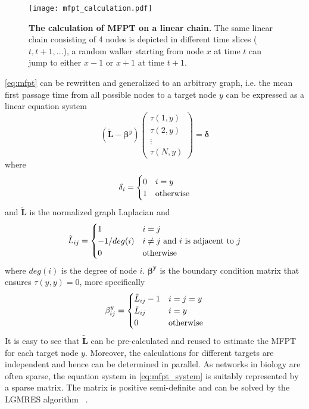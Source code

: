 \begin{figure}[!ht]
\begin{center}
\texttt{[image: mfpt\_calculation.pdf]}
\end{center}
\caption[MFPT calculation]{
{\bf The calculation of MFPT on a linear chain.}
The same linear chain consisting of 4 nodes is depicted in different time 
slices ($t,t+1,\ldots$), 
a random walker starting from node $x$ at time $t$ can jump to either $x-1$ 
or $x+1$ at time $t+1$.
}
\label{fig:mfpt_calculation}
\end{figure}

\ref{eq:mfpt} can be rewritten and generalized to an arbitrary graph, i.e.
the mean first passage time from all possible nodes to a target node $y$
can be expressed as a linear equation system
\begin{equation}
(\tilde{\mathbf{L}}-\boldsymbol{\beta}^y) 
\begin{pmatrix}
\tau(1,y)\\
\tau(2,y)\\
\vdots\\
\tau(N,y)
\end{pmatrix}
= \boldsymbol{\delta}
\label{eq:mfpt_system}
\end{equation}
where 
\begin{equation}
\delta_i=
\begin{cases}
0 & i=y\\
1 & \textnormal{otherwise}
\end{cases}
\end{equation}
and $\tilde{\mathbf{L}}$ is the normalized graph Laplacian and
\begin{equation}
\tilde{L}_{ij}=
\begin{cases}
1 & i=j\\
-1/deg(i) & i \neq j \ \textnormal{and}\ i \ \textnormal{is adjacent to}\ j \\
0 & \textnormal{otherwise}
\end{cases}
\end{equation}
where $deg(i)$ is the degree of node $i$. $\boldsymbol{\beta^y}$ 
is the boundary condition
matrix that ensures $\tau(y,y)=0$, more specifically
\begin{equation}
\beta^y_{ij}=
\begin{cases}
\tilde{L}_{ij}-1 & i=j=y\\
\tilde{L}_{ij} & i=y\\
0 & \textnormal{otherwise}
\end{cases}
\end{equation}
It is easy to see that $\tilde{\mathbf{L}}$ can be pre-calculated and 
reused to estimate the
MFPT for each target node $y$. Moreover, the calculations
for different targets are independent and hence can be
determined in parallel. As networks in biology are often
sparse, the equation system in \ref{eq:mfpt_system}
is suitably represented by a sparse matrix. The matrix
is positive semi-definite and can be solved by the LGMRES algorithm~%
\citep{Baker2005}.

